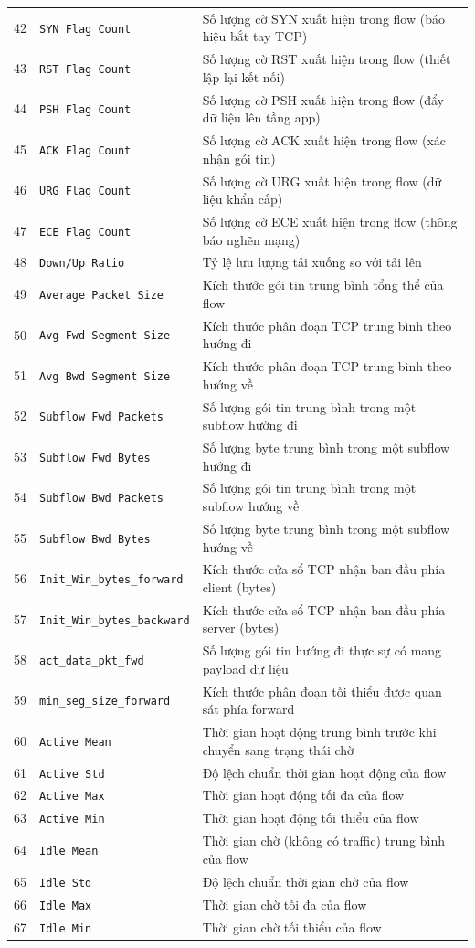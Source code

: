 \begin{longtable}{rlp{7.2cm}}
42 & \texttt{SYN Flag Count} & Số lượng cờ SYN xuất hiện trong flow (báo hiệu bắt tay TCP) \\
43 & \texttt{RST Flag Count} & Số lượng cờ RST xuất hiện trong flow (thiết lập lại kết nối) \\
44 & \texttt{PSH Flag Count} & Số lượng cờ PSH xuất hiện trong flow (đẩy dữ liệu lên tầng app) \\
45 & \texttt{ACK Flag Count} & Số lượng cờ ACK xuất hiện trong flow (xác nhận gói tin) \\
46 & \texttt{URG Flag Count} & Số lượng cờ URG xuất hiện trong flow (dữ liệu khẩn cấp) \\
47 & \texttt{ECE Flag Count} & Số lượng cờ ECE xuất hiện trong flow (thông báo nghẽn mạng) \\
48 & \texttt{Down/Up Ratio} & Tỷ lệ lưu lượng tải xuống so với tải lên \\
49 & \texttt{Average Packet Size} & Kích thước gói tin trung bình tổng thể của flow \\
50 & \texttt{Avg Fwd Segment Size} & Kích thước phân đoạn TCP trung bình theo hướng đi \\
51 & \texttt{Avg Bwd Segment Size} & Kích thước phân đoạn TCP trung bình theo hướng về \\
52 & \texttt{Subflow Fwd Packets} & Số lượng gói tin trung bình trong một subflow hướng đi \\
53 & \texttt{Subflow Fwd Bytes} & Số lượng byte trung bình trong một subflow hướng đi \\
54 & \texttt{Subflow Bwd Packets} & Số lượng gói tin trung bình trong một subflow hướng về \\
55 & \texttt{Subflow Bwd Bytes} & Số lượng byte trung bình trong một subflow hướng về \\
56 & \texttt{Init\_Win\_bytes\_forward} & Kích thước cửa sổ TCP nhận ban đầu phía client (bytes) \\
57 & \texttt{Init\_Win\_bytes\_backward} & Kích thước cửa sổ TCP nhận ban đầu phía server (bytes) \\
58 & \texttt{act\_data\_pkt\_fwd} & Số lượng gói tin hướng đi thực sự có mang payload dữ liệu \\
59 & \texttt{min\_seg\_size\_forward} & Kích thước phân đoạn tối thiểu được quan sát phía forward \\
60 & \texttt{Active Mean} & Thời gian hoạt động trung bình trước khi chuyển sang trạng thái chờ \\
61 & \texttt{Active Std} & Độ lệch chuẩn thời gian hoạt động của flow \\
62 & \texttt{Active Max} & Thời gian hoạt động tối đa của flow \\
63 & \texttt{Active Min} & Thời gian hoạt động tối thiểu của flow \\
64 & \texttt{Idle Mean} & Thời gian chờ (không có traffic) trung bình của flow \\
65 & \texttt{Idle Std} & Độ lệch chuẩn thời gian chờ của flow \\
66 & \texttt{Idle Max} & Thời gian chờ tối đa của flow \\
67 & \texttt{Idle Min} & Thời gian chờ tối thiểu của flow \\
\end{longtable}
